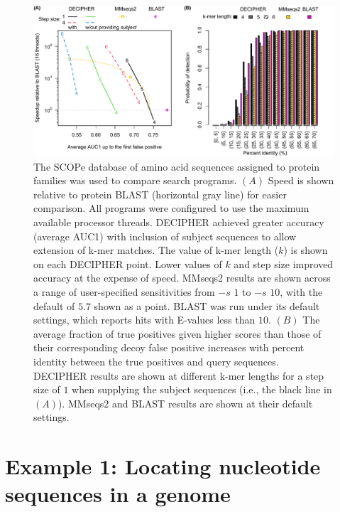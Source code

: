 \begin{figure}
\includegraphics[width=1\linewidth]{figures/Fig3} \caption{The SCOPe database of amino acid sequences assigned to protein families was used to compare search programs. $(A)$ Speed is shown relative to protein BLAST (horizontal gray line) for easier comparison. All programs were configured to use the maximum available processor threads. DECIPHER achieved greater accuracy (average AUC1) with inclusion of subject sequences to allow extension of k-mer matches. The value of k-mer length ($k$) is shown on each DECIPHER point. Lower values of $k$ and step size improved accuracy at the expense of speed. MMseqs2 results are shown across a range of user-specified sensitivities from $-s$ $1$ to $-s$ $10$, with the default of $5.7$ shown as a point. BLAST was run under its default settings, which reports hits with E-values less than $10$. $(B)$ The average fraction of true positives given higher scores than those of their corresponding decoy false positive increases with percent identity between the true positives and query sequences. DECIPHER results are shown at different k-mer lengths for a step size of $1$ when supplying the subject sequences (i.e., the black line in $(A)$). MMseqs2 and BLAST results are shown at their default settings.}\label{fig:fig3}
\end{figure}

\section{Example 1: Locating nucleotide sequences in a genome}\label{example-1-locating-nucleotide-sequences-in-a-genome}

